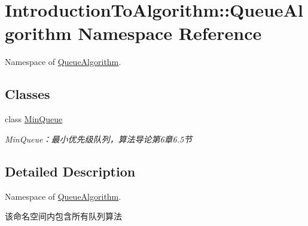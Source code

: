 \hypertarget{namespace_introduction_to_algorithm_1_1_queue_algorithm}{}\section{Introduction\+To\+Algorithm\+:\+:Queue\+Algorithm Namespace Reference}
\label{namespace_introduction_to_algorithm_1_1_queue_algorithm}


Namespace of \hyperlink{namespace_introduction_to_algorithm_1_1_queue_algorithm}{Queue\+Algorithm}.  


\subsection*{Classes}
\begin{DoxyCompactItemize}
\item 
class \hyperlink{class_introduction_to_algorithm_1_1_queue_algorithm_1_1_min_queue}{Min\+Queue}
\begin{DoxyCompactList}\small\item\em Min\+Queue：最小优先级队列，算法导论第6章6.5节 \end{DoxyCompactList}\end{DoxyCompactItemize}


\subsection{Detailed Description}
Namespace of \hyperlink{namespace_introduction_to_algorithm_1_1_queue_algorithm}{Queue\+Algorithm}. 

该命名空间内包含所有队列算法 